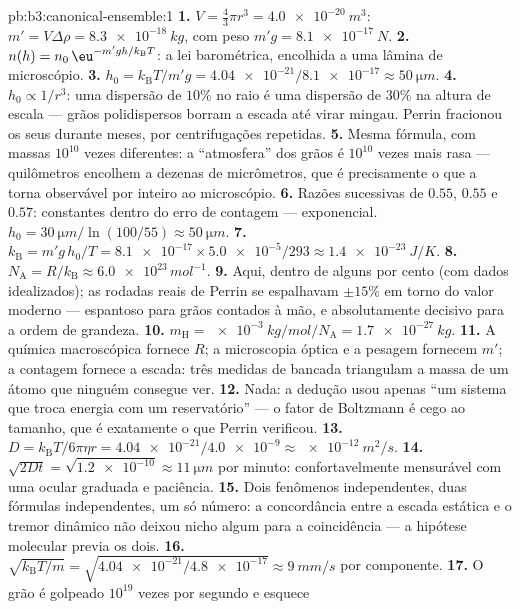 \begin{solution}{pb:b3:canonical-ensemble:1}
\textbf{1.} $V = \tfrac43\pi r^3 = \qty{4.0e-20}{m^3}$: $m' = V
\Delta\rho = \qty{8.3e-18}{kg}$, com peso $m'g = \qty{8.1e-17}{N}$.
\textbf{2.} $n(h) = n_0\,\eu^{-m'gh/k_{\text{B}}T}$: a lei barométrica,
encolhida a uma lâmina de microscópio.
\textbf{3.} $h_0 = k_{\text{B}}T/m'g = \num{4.04e-21}/\num{8.1e-17}
\approx \qty{50}{\micro m}$.
\textbf{4.} $h_0 \propto 1/r^3$: uma dispersão de $10\%$ no raio é uma
dispersão de $30\%$ na altura de escala --- grãos polidispersos borram
a escada até virar mingau. Perrin fracionou os seus durante meses, por
centrifugações repetidas.
\textbf{5.} Mesma fórmula, com massas $10^{10}$ vezes diferentes: a
``atmosfera'' dos grãos é $10^{10}$ vezes mais rasa --- quilômetros
encolhem a dezenas de micrômetros, que é precisamente o que a torna
observável por inteiro ao microscópio.
\textbf{6.} Razões sucessivas de $0.55$, $0.55$ e $0.57$: constantes
dentro do erro de contagem --- exponencial. $h_0 =
\qty{30}{\micro m}/\ln(100/55) \approx \qty{50}{\micro m}$.
\textbf{7.} $k_{\text{B}} = m'g\,h_0/T = \num{8.1e-17} \times
\num{5.0e-5}/293 \approx \qty{1.4e-23}{J/K}$.
\textbf{8.} $N_{\text{A}} = R/k_{\text{B}} \approx
\num{6.0e23}\,\unit{mol^{-1}}$.
\textbf{9.} Aqui, dentro de alguns por cento (com dados idealizados);
as rodadas reais de Perrin se espalhavam $\pm15\%$ em torno do valor
moderno --- espantoso para grãos contados à mão, e absolutamente
decisivo para a ordem de grandeza.
\textbf{10.} $m_{\text{H}} = \qty{e-3}{kg/mol}/N_{\text{A}} =
\qty{1.7e-27}{kg}$.
\textbf{11.} A química macroscópica fornece $R$; a microscopia óptica e
a pesagem fornecem $m'$; a contagem fornece a escada: três medidas de
bancada triangulam a massa de um átomo que ninguém consegue ver.
\textbf{12.} Nada: a dedução usou apenas ``um sistema que troca energia
com um reservatório'' --- o fator de Boltzmann é cego ao tamanho, que é
exatamente o que Perrin verificou.
\textbf{13.} $D = k_{\text{B}}T/6\pi\eta r =
\num{4.04e-21}/\num{4.0e-9} \approx \qty{e-12}{m^2/s}$.
\textbf{14.} $\sqrt{2Dt} = \sqrt{\num{1.2e-10}} \approx
\qty{11}{\micro m}$ por minuto: confortavelmente mensurável com uma
ocular graduada e paciência.
\textbf{15.} Dois fenômenos independentes, duas fórmulas independentes,
um só número: a concordância entre a escada estática e o tremor
dinâmico não deixou nicho algum para a coincidência --- a hipótese
molecular previa os dois.
\textbf{16.} $\sqrt{k_{\text{B}}T/m} = \sqrt{\num{4.04e-21}/
\num{4.8e-17}} \approx \qty{9}{mm/s}$ por componente.
\textbf{17.} O grão é golpeado $10^{19}$ vezes por segundo e esquece

\end{solution}
